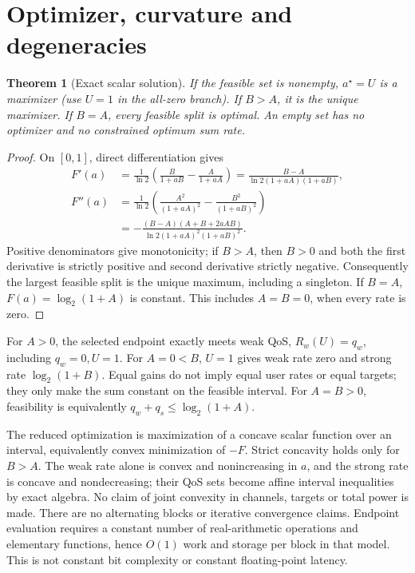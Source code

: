 \documentclass[11pt]{article}
\newtheorem{theorem}{Theorem}
\begin{document}
\section{Optimizer, curvature and degeneracies}
\begin{theorem}[Exact scalar solution]
If the feasible set is nonempty, \(a^\star=U\) is a maximizer (use
\(U=1\) in the all-zero branch). If \(B>A\), it is the unique maximizer.
If \(B=A\), every feasible split is optimal. An empty set has no optimizer
and no constrained optimum sum rate.
\end{theorem}
\begin{proof}
On \([0,1]\), direct differentiation gives
\begin{align}
 F'(a)&=\frac{1}{\ln2}\left(\frac{B}{1+aB}-\frac{A}{1+aA}\right)
       =\frac{B-A}{\ln2(1+aA)(1+aB)},\\
 F''(a)&=\frac{1}{\ln2}\left(\frac{A^2}{(1+aA)^2}
                              -\frac{B^2}{(1+aB)^2}\right)\\
 &=-\frac{(B-A)(A+B+2aAB)}{\ln2(1+aA)^2(1+aB)^2}.
\end{align}
Positive denominators give monotonicity; if \(B>A\), then \(B>0\)
and both the first derivative is strictly positive and second derivative
strictly negative. Consequently the largest feasible split is the unique
maximum, including a singleton. If \(B=A\), \(F(a)=\log_2(1+A)\)
is constant. This includes \(A=B=0\), when every rate is zero.
\end{proof}
For \(A>0\), the selected endpoint exactly meets weak QoS,
\(R_w(U)=q_w\), including \(q_w=0,U=1\). For \(A=0<B\),
\(U=1\) gives weak rate zero and strong rate \(\log_2(1+B)\).
Equal gains do not imply equal user rates or equal targets; they only
make the sum constant on the feasible interval. For \(A=B>0\), feasibility
is equivalently \(q_w+q_s\leq\log_2(1+A)\).

The reduced optimization is maximization of a concave scalar function over
an interval, equivalently convex minimization of \(-F\). Strict concavity
holds only for \(B>A\). The weak rate alone is convex and nonincreasing
in \(a\), and the strong rate is concave and nondecreasing; their QoS
sets become affine interval inequalities by exact algebra. No claim of
joint convexity in channels, targets or total power is made. There are
no alternating blocks or iterative convergence claims. Endpoint evaluation
requires a constant number of real-arithmetic operations and elementary
functions, hence \(O(1)\) work and storage per block in that model.
This is not constant bit complexity or constant floating-point latency.
\end{document}
